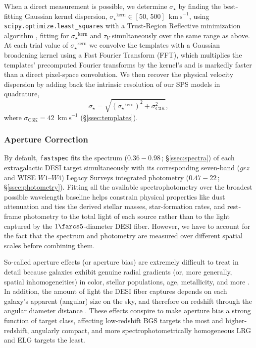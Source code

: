 \documentclass[modern,linenumbers]{aastex702}
\newcommand{\fastspec}{\texttt{fastspec}}
\newcommand{\kms}{\ensuremath{\mathrm{km~s}^{-1}}}
\newcommand{\vdisp}{\ensuremath{\sigma_\star}}
\newcommand{\tauv}{\ensuremath{\tau_V}}
\begin{document}
When a direct measurement is possible, we determine \vdisp{} by
finding the best-fitting Gaussian kernel
dispersion, $\vdisp^\mathrm{kern} \in [50,\,500]$~\kms, using
\texttt{scipy.optimize.least\_squares} with a Trust-Region Reflective
minimization algorithm \citep{branch99a}, fitting for
$\vdisp^\mathrm{kern}$ and \tauv{} simultaneously over the same range
as above. At each trial value of $\vdisp^\mathrm{kern}$ we convolve
the templates with a Gaussian broadening kernel using a Fast Fourier
Transform (FFT), which multiplies the templates' precomputed Fourier
transforms by the kernel's and is markedly faster than a direct
pixel-space convolution. We then recover the physical velocity
dispersion by adding back the intrinsic resolution of our SPS models
in quadrature,
\begin{equation}
  \vdisp = \sqrt{(\vdisp^\mathrm{kern})^2 + \sigma_\mathrm{C3K}^2},
  \label{eq:vdisptot}
\end{equation}
where $\sigma_\mathrm{C3K}=42$~\kms{} (\S\ref{ssec:templates}).

\subsubsection{Aperture Correction}
\label{sssec:apercorr}

By default, \fastspec{} fits the spectrum ($0.36-0.98$\,\micron;
\S\ref{ssec:spectra}) of each extragalactic DESI target simultaneously
with its corresponding seven-band ($grz$ and WISE $W1$--$W4$) Legacy
Surveys integrated photometry ($0.47-22$\,\micron;
\S\ref{ssec:photometry}). Fitting all the available spectrophotometry
over the broadest possible wavelength baseline helps constrain
physical properties like dust attenuation and ties the derived
stellar masses, star-formation rates, and rest-frame photometry to the
total light of each source rather than to the light captured by the
$1\farcs5$-diameter DESI fiber. However, we have to account for the
fact that the spectrum and photometry are measured over different
spatial scales before combining them.

So-called aperture effects (or aperture bias) are extremely difficult
to treat in detail because galaxies exhibit genuine radial gradients
(or, more generally, spatial inhomogeneities) in color, stellar
populations, age, metallicity, and more \citep[and references
  therein]{sanchez20a}. In addition, the amount of light the DESI
fiber captures depends on each galaxy's apparent (angular) size on the
sky, and therefore on redshift through the angular diameter distance
\citep{hogg99a}. These effects conspire to make aperture bias a strong
function of target class, affecting low-redshift BGS targets the most
and higher-redshift, angularly compact, and more
spectrophotometrically homogeneous LRG and ELG targets the least.
\end{document}

